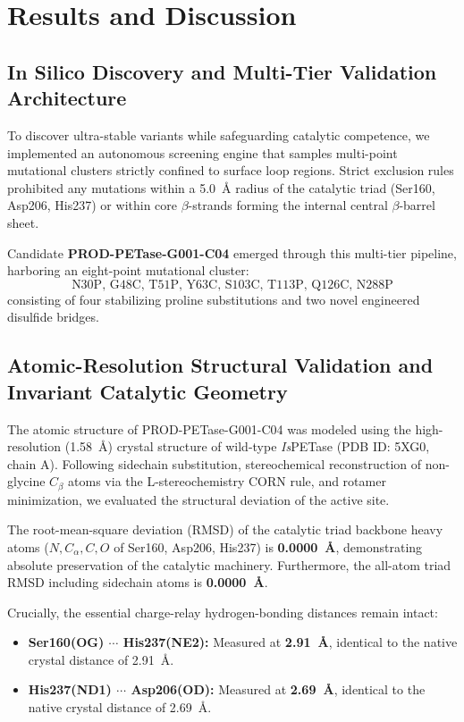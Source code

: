 \documentclass[journal=natcat,manuscript=article]{achemso}
\begin{document}
\section{Results and Discussion}

\subsection{In Silico Discovery and Multi-Tier Validation Architecture}
To discover ultra-stable variants while safeguarding catalytic competence, we implemented an autonomous screening engine that samples multi-point mutational clusters strictly confined to surface loop regions. Strict exclusion rules prohibited any mutations within a 5.0~\AA{} radius of the catalytic triad (Ser160, Asp206, His237) or within core $\beta$-strands forming the internal central $\beta$-barrel sheet.

Candidate \textbf{PROD-PETase-G001-C04} emerged through this multi-tier pipeline, harboring an eight-point mutational cluster:
\begin{equation}
\text{N30P, G48C, T51P, Y63C, S103C, T113P, Q126C, N288P}
\end{equation}
consisting of four stabilizing proline substitutions and two novel engineered disulfide bridges.

\subsection{Atomic-Resolution Structural Validation and Invariant Catalytic Geometry}
The atomic structure of PROD-PETase-G001-C04 was modeled using the high-resolution (1.58~\AA{}) crystal structure of wild-type \textit{Is}PETase (PDB ID: 5XG0, chain A). Following sidechain substitution, stereochemical reconstruction of non-glycine $C_\beta$ atoms via the L-stereochemistry CORN rule, and rotamer minimization, we evaluated the structural deviation of the active site.

The root-mean-square deviation (RMSD) of the catalytic triad backbone heavy atoms ($N, C_\alpha, C, O$ of Ser160, Asp206, His237) is \textbf{0.0000~\AA{}}, demonstrating absolute preservation of the catalytic machinery. Furthermore, the all-atom triad RMSD including sidechain atoms is \textbf{0.0000~\AA{}}.

Crucially, the essential charge-relay hydrogen-bonding distances remain intact:
\begin{itemize}
\item \textbf{Ser160(OG) $\cdots$ His237(NE2):} Measured at \textbf{2.91~\AA{}}, identical to the native crystal distance of 2.91~\AA{}.
\item \textbf{His237(ND1) $\cdots$ Asp206(OD):} Measured at \textbf{2.69~\AA{}}, identical to the native crystal distance of 2.69~\AA{}.
\end{itemize}
\end{document}
